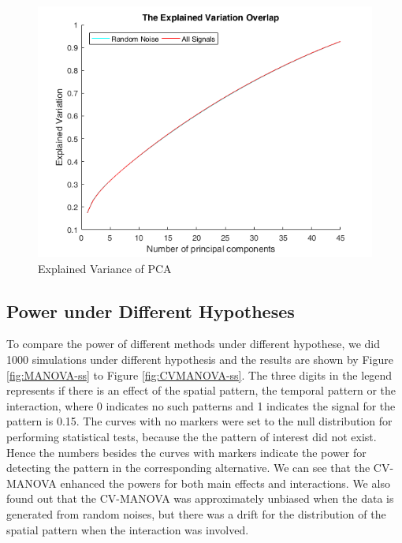 \documentclass[english]{article}\usepackage[]{graphicx}\usepackage[]{color}
\begin{document}
\begin{figure}[H]
\centering{}\includegraphics[scale=0.55]{4C__Users_Hao_Dropbox_NewtermPHD_TERM2_SS9833B____in_imaging_data_Report_MANOVA_PCA_Variation.png}\protect\caption{Explained Variance of PCA\label{fig:Explained-Variance-of}}
\end{figure}



\subsection{Power under Different Hypotheses}

To compare the power of different methods under different hypothese,
we did 1000 simulations under different hypothesis and the results
are shown by Figure \ref{fig:MANOVA-ss} to Figure \ref{fig:CVMANOVA-ss}.
The three digits in the legend represents if there is an effect of
the spatial pattern, the temporal pattern or the interaction, where
0 indicates no such patterns and 1 indicates the signal for the pattern
is 0.15. The curves with no markers were set to the null distribution
for performing statistical tests, because the the pattern of interest
did not exist. Hence the numbers besides the curves with markers indicate
the power for detecting the pattern in the corresponding alternative.
We can see that the CV-MANOVA enhanced the powers for both main effects
and interactions. We also found out that the CV-MANOVA was approximately
unbiased when the data is generated from random noises, but there
was a drift for the distribution of the spatial pattern when the interaction
was involved.
\end{document}
